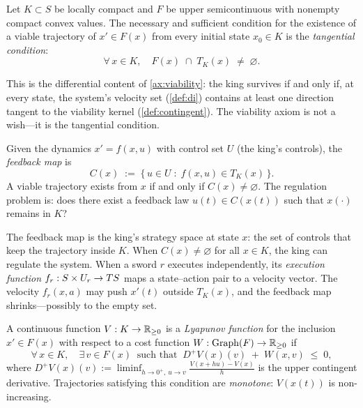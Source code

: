 \begin{theorem}\label{thm:viability-di}
Let $K \subset S$ be locally compact and $F$ be upper semicontinuous
with nonempty compact convex values.  The necessary and sufficient
condition for the existence of a viable trajectory of
$x' \in F(x)$ from every initial state $x_0 \in K$ is the
\emph{tangential condition}:
\[
  \forall\, x \in K, \quad
  F(x) \;\cap\; T_K(x) \;\neq\; \varnothing.
\]
\end{theorem}

This is the differential content of \cref{ax:viability}: the king
survives if and only if, at every state, the system's velocity set
(\cref{def:di}) contains at least one direction tangent to the
viability kernel (\cref{def:contingent}).
The viability axiom is not a wish---it is the tangential condition.

\begin{definition}\label{def:feedback}
Given the dynamics $x' = f(x, u)$ with control set $U$ (the king's
controls), the \emph{feedback map} is
\[
  C(x) \;:=\; \bigl\{\, u \in U \;:\;
  f(x, u) \in T_K(x) \,\bigr\}.
\]
A viable trajectory exists from $x$ if and only if $C(x) \neq
\varnothing$.  The regulation problem is: does there exist a
feedback law $u(t) \in C(x(t))$ such that $x(\cdot)$ remains in $K$?
\end{definition}

The feedback map is the king's strategy space at state $x$: the set
of controls that keep the trajectory inside $K$.  When $C(x) \neq
\varnothing$ for all $x \in K$, the king can regulate the system.
When a sword $r$ executes independently, its \emph{execution function}
$f_r: S \times U_r \to TS$ maps a state--action pair to a velocity
vector.  The velocity $f_r(x, a)$ may push $x'(t)$ outside $T_K(x)$,
and the feedback map shrinks---possibly to the empty set.

\begin{definition}\label{def:lyapunov}
A continuous function $V: K \to \mathbb{R}_{\geq 0}$ is a \emph{Lyapunov function}
for the inclusion $x' \in F(x)$ with respect to a cost function
$W: \mathrm{Graph}(F) \to \mathbb{R}_{\geq 0}$ if
\[
  \forall\, x \in K, \quad
  \exists\, v \in F(x) \;\;\text{such that}\;\;
  D^+ V(x)(v) \;+\; W(x, v) \;\leq\; 0,
\]
where $D^+ V(x)(v) := \liminf_{h \to 0^+,\, u \to v}
\frac{V(x + hu) - V(x)}{h}$ is the upper contingent derivative.
Trajectories satisfying this condition are \emph{monotone}: $V(x(t))$
is non-increasing.
\end{definition}

